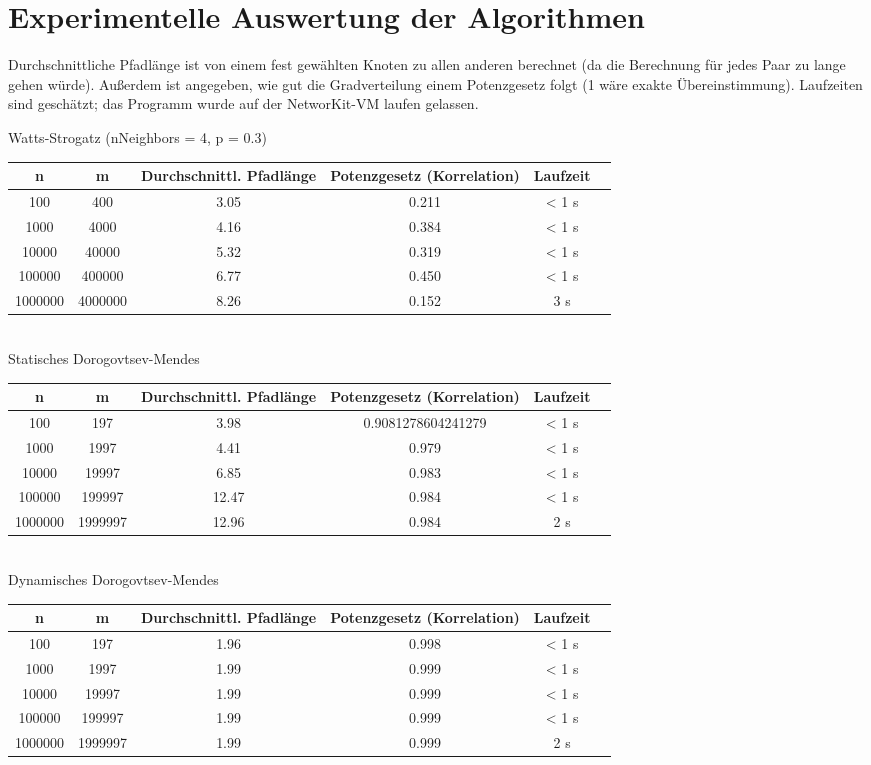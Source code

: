 \documentclass[a4paper]{scrartcl}
\begin{document}
\section{Experimentelle Auswertung der Algorithmen}
Durchschnittliche Pfadlänge ist von einem fest gewählten Knoten zu allen anderen berechnet (da die Berechnung für jedes Paar zu lange gehen würde). Außerdem ist angegeben, wie gut die Gradverteilung einem Potenzgesetz folgt (1 wäre exakte Übereinstimmung). Laufzeiten sind geschätzt; das Programm wurde auf der NetworKit-VM laufen gelassen.

Watts-Strogatz (nNeighbors = 4, p = 0.3)\\
\begin{tabular}{|c|c|c|c|c|c|}\hline
n & m & Durchschnittl. Pfadlänge & Potenzgesetz (Korrelation) & Laufzeit \\\hline
100 & 400 & 3.05 & 0.211 & < 1 s \\\hline
1000 & 4000 & 4.16 & 0.384 & < 1 s \\\hline
10000 & 40000 & 5.32 & 0.319 & < 1 s \\\hline
100000 & 400000 & 6.77 & 0.450 & < 1 s \\\hline
1000000 & 4000000 & 8.26 & 0.152 & 3 s \\\hline
\end{tabular}\\

Statisches Dorogovtsev-Mendes\\
\begin{tabular}{|c|c|c|c|c|c|}\hline
n & m & Durchschnittl. Pfadlänge & Potenzgesetz (Korrelation) & Laufzeit \\\hline
100 & 197 & 3.98 & 0.9081278604241279 & < 1 s \\\hline
1000 & 1997 & 4.41 & 0.979 & < 1 s \\\hline
10000 & 19997 & 6.85 & 0.983 & < 1 s \\\hline
100000 & 199997 & 12.47 & 0.984 & < 1 s \\\hline
1000000 & 1999997 & 12.96 & 0.984 & 2 s \\\hline
\end{tabular}\\

Dynamisches Dorogovtsev-Mendes\\
\begin{tabular}{|c|c|c|c|c|c|}\hline
n & m & Durchschnittl. Pfadlänge & Potenzgesetz (Korrelation) & Laufzeit \\\hline
100 & 197 & 1.96 & 0.998 & < 1 s \\\hline
1000 & 1997 & 1.99 & 0.999 & < 1 s \\\hline
10000 & 19997 & 1.99 & 0.999 & < 1 s \\\hline
100000 & 199997 & 1.99 & 0.999 & < 1 s \\\hline
1000000 & 1999997 & 1.99 & 0.999 & 2 s \\\hline
\end{tabular}\\
\end{document}
